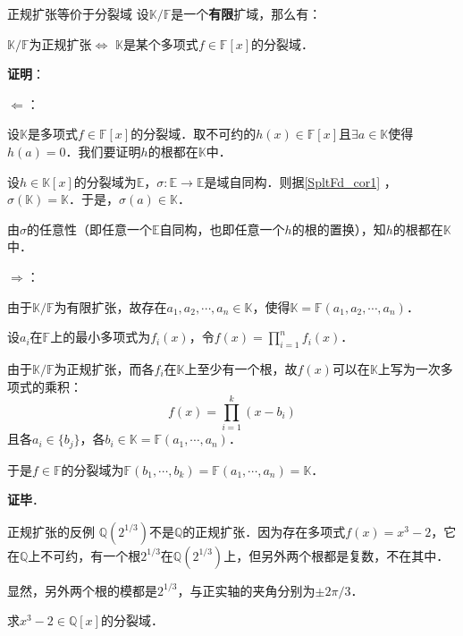 \begin{theorem}{正规扩张等价于分裂域}\label{SpltFd_the2}
设$\mathbb{K}/\mathbb{F}$是一个\textbf{有限}扩域，那么有：

$\mathbb{K}/\mathbb{F}$为正规扩张$\iff$ $\mathbb{K}$是某个多项式$f\in\mathbb{F}[x]$的分裂域．
\end{theorem}

\textbf{证明}：

$\Leftarrow$：

设$\mathbb{K}$是多项式$f\in\mathbb{F}[x]$的分裂域．取不可约的$h(x)\in\mathbb{F}[x]$且$\exists a\in\mathbb{K}$使得$h(a)=0$．我们要证明$h$的根都在$\mathbb{K}$中．


设$h\in\mathbb{K}[x]$的分裂域为$\mathbb{E}$，$\sigma:\mathbb{E}\to\mathbb{E}$是域自同构．则据\autoref{SpltFd_cor1} ，$\sigma(\mathbb{K})=\mathbb{K}$．于是，$\sigma(a)\in\mathbb{K}$．

由$\sigma$的任意性（即任意一个$\mathbb{E}$自同构，也即任意一个$h$的根的置换），知$h$的根都在$\mathbb{K}$中．



$\Rightarrow$：

由于$\mathbb{K}/\mathbb{F}$为有限扩张，故存在$a_1, a_2, \cdots, a_n\in \mathbb{K}$，使得$\mathbb{K}=\mathbb{F}(a_1, a_2, \cdots, a_n)$．

设$a_i$在$\mathbb{F}$上的最小多项式为$f_i(x)$，令$f(x)=\prod_{i=1}^n f_i(x)$．

由于$\mathbb{K}/\mathbb{F}$为正规扩张，而各$f_i$在$\mathbb{K}$上至少有一个根，故$f(x)$可以在$\mathbb{K}$上写为一次多项式的乘积：
\begin{equation}
f(x) = \prod_{i=1}^k (x-b_i)
\end{equation}
且各$a_i\in\{b_j\}$，各$b_i\in\mathbb{K}=\mathbb{F}(a_1, \cdots, a_n)$．

于是$f\in\mathbb{F}$的分裂域为$\mathbb{F}(b_1, \cdots, b_k)=\mathbb{F}(a_1, \cdots, a_n)=\mathbb{K}$．

\textbf{证毕}．


\begin{example}{正规扩张的反例}
$\mathbb{Q}(2^{1/3})$不是$\mathbb{Q}$的正规扩张．因为存在多项式$f(x)=x^3-2$，它在$\mathbb{Q}$上不可约，有一个根$2^{1/3}$在$\mathbb{Q}(2^{1/3})$上，但另外两个根都是复数，不在其中．

显然，另外两个根的模都是$2^{1/3}$，与正实轴的夹角分别为$\pm 2\pi/3$．
\end{example}

\begin{exercise}{}
求$x^3-2\in\mathbb{Q}[x]$的分裂域．
\end{exercise}













